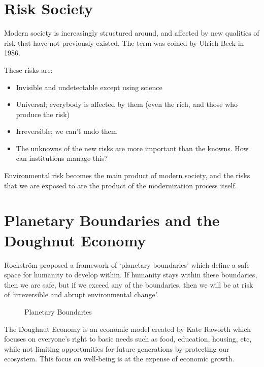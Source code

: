 \section{Risk Society}

Modern society is increasingly structured around, and affected by new
qualities of risk that have not previously existed. The term was
coined by Ulrich Beck in 1986.

These risks are:
\begin{itemize}
  \item Invisible and undetectable except using science
  \item Universal; everybody is affected by them (even the rich, and
    those who produce the risk)
  \item Irreversible; we can't undo them
  \item The unknowns of the new risks are more important than the
    knowns. How can institutions manage this?
\end{itemize}

Environmental risk becomes the main product of modern society, and the
risks that we are exposed to are the product of the modernization
process itself.

\section{Planetary Boundaries and the Doughnut Economy}

Rockström proposed a framework of `planetary boundaries' which define
a safe space for humanity to develop within. If humanity stays within
these boundaries, then we are safe, but if we exceed any of the
boundaries, then we will be at risk of `irreversible and abrupt
environmental change'.

\begin{figure}[H]
 \centering
 
 \caption{Planetary Boundaries}
\end{figure}

The Doughnut Economy is an economic model created by Kate Raworth which
focuses on everyone's right to basic needs such as food, education,
housing, etc, while not limiting opportunities for future generations
by protecting our ecosystem. This focus on well-being is at the expense
of economic growth.

